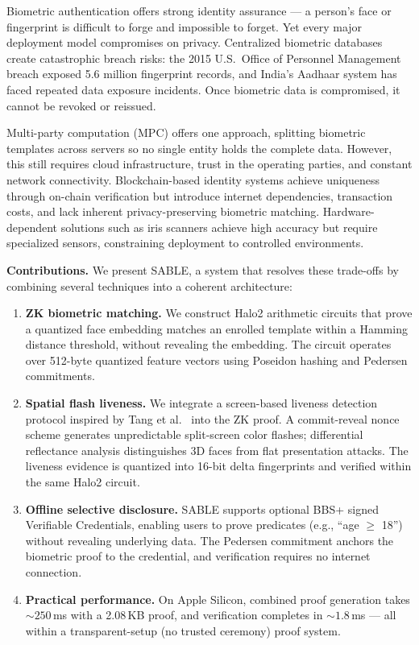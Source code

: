\documentclass[conference]{IEEEtran}
\begin{document}
Biometric authentication offers strong identity assurance --- a person's face or fingerprint is difficult to forge and impossible to forget. Yet every major deployment model compromises on privacy. Centralized biometric databases create catastrophic breach risks: the 2015 U.S.\ Office of Personnel Management breach exposed 5.6 million fingerprint records, and India's Aadhaar system has faced repeated data exposure incidents. Once biometric data is compromised, it cannot be revoked or reissued.

Multi-party computation (MPC) offers one approach, splitting biometric templates across servers so no single entity holds the complete data. However, this still requires cloud infrastructure, trust in the operating parties, and constant network connectivity. Blockchain-based identity systems achieve uniqueness through on-chain verification but introduce internet dependencies, transaction costs, and lack inherent privacy-preserving biometric matching. Hardware-dependent solutions such as iris scanners achieve high accuracy but require specialized sensors, constraining deployment to controlled environments.

\textbf{Contributions.} We present SABLE, a system that resolves these trade-offs by combining several techniques into a coherent architecture:

\begin{enumerate}
\item \textbf{ZK biometric matching.} We construct Halo2 arithmetic circuits that prove a quantized face embedding matches an enrolled template within a Hamming distance threshold, without revealing the embedding. The circuit operates over 512-byte quantized feature vectors using Poseidon hashing and Pedersen commitments.

\item \textbf{Spatial flash liveness.} We integrate a screen-based liveness detection protocol inspired by Tang et al.~\cite{tang2018} into the ZK proof. A commit-reveal nonce scheme generates unpredictable split-screen color flashes; differential reflectance analysis distinguishes 3D faces from flat presentation attacks. The liveness evidence is quantized into 16-bit delta fingerprints and verified within the same Halo2 circuit.

\item \textbf{Offline selective disclosure.} SABLE supports optional BBS+ signed Verifiable Credentials, enabling users to prove predicates (e.g., ``age $\geq$ 18'') without revealing underlying data. The Pedersen commitment anchors the biometric proof to the credential, and verification requires no internet connection.

\item \textbf{Practical performance.} On Apple Silicon, combined proof generation takes ${\sim}250$\,ms with a 2.08\,KB proof, and verification completes in ${\sim}1.8$\,ms --- all within a transparent-setup (no trusted ceremony) proof system.
\end{enumerate}
\end{document}
